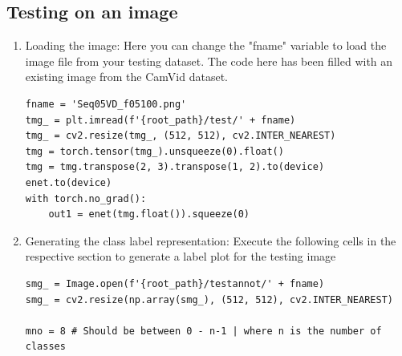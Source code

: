 \subsection*{Testing on an image}
\begin{enumerate}
    \item Loading the image: Here you can change the "fname" variable to load the image file from your testing dataset. The code here has been filled with an existing image from the CamVid dataset.
          \begin{lstlisting}
fname = 'Seq05VD_f05100.png'
tmg_ = plt.imread(f'{root_path}/test/' + fname)
tmg_ = cv2.resize(tmg_, (512, 512), cv2.INTER_NEAREST)
tmg = torch.tensor(tmg_).unsqueeze(0).float()
tmg = tmg.transpose(2, 3).transpose(1, 2).to(device)
enet.to(device)
with torch.no_grad():
    out1 = enet(tmg.float()).squeeze(0)
\end{lstlisting}
    \item Generating the class label representation: Execute the following cells in the respective section to generate a label plot for the testing image
          \begin{lstlisting}
smg_ = Image.open(f'{root_path}/testannot/' + fname)
smg_ = cv2.resize(np.array(smg_), (512, 512), cv2.INTER_NEAREST)

mno = 8 # Should be between 0 - n-1 | where n is the number of classes


\end{lstlisting}
\end{enumerate}
